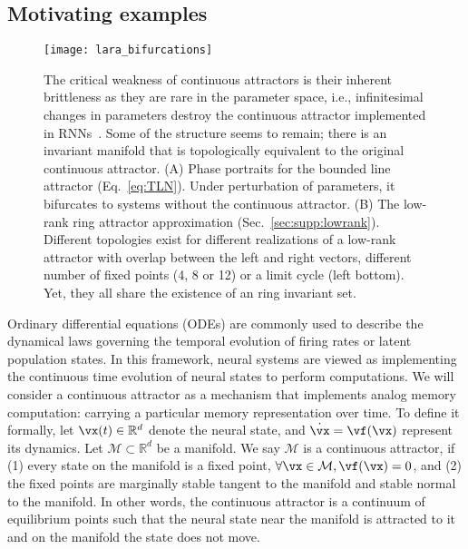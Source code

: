 \documentclass{article} %
\newcounter{ct}
\newcommand{\reals}{\mathbb{R}}
\newcommand{\manifold}{\mathcal{M}}
\theoremstyle{definition}
\theoremstyle{remark}
\renewcommand{\cite}{\citep}
\begin{document}
\subsection{Motivating examples}\label{sec:motivating}
\begin{figure}[tbhp]
  \centering
  \texttt{[image: lara\_bifurcations]}
  \caption{The critical weakness of continuous attractors is their inherent brittleness as they are rare in the parameter space, i.e., infinitesimal changes in parameters destroy the continuous attractor implemented in RNNs~\cite{seung1996,Renart2003}.
  Some of the structure seems to remain; there is an invariant manifold that is topologically equivalent to the original continuous attractor.
    (A) Phase portraits for the bounded line attractor (Eq.~\eqref{eq:TLN}).
    Under perturbation of parameters, it bifurcates to systems without the continuous attractor.
    (B) The low-rank ring attractor approximation (Sec.~\eqref{sec:supp:lowrank}).
    Different topologies exist for different realizations of a low-rank attractor with overlap between the left and right vectors, different number of fixed points (4, 8 or 12) or a limit cycle (left bottom).
    Yet, they all share the existence of an ring invariant set.
}
\label{fig:lara_bifurcations}
\end{figure}


Ordinary differential equations (ODEs) are commonly used to describe the dynamical laws governing the temporal evolution of firing rates or latent population states\cite{vyas2020}.
In this framework, neural systems are viewed as implementing the continuous time evolution of neural states to perform computations.
We will consider a continuous attractor as a mechanism that implements analog memory computation: carrying a particular memory representation over time.
To define it formally, let $\vx(t) \in \reals^d$ denote the neural state, and $\dot{\vx} = \vf(\vx)$ represent its dynamics.
Let $\manifold \subset \reals^d$ be a manifold.
We say $\manifold$ is a continuous attractor, if (1) every state on the manifold is a fixed point, $\forall \vx \in \manifold, \vf(\vx) = 0$, and (2) the fixed points are marginally stable tangent to the manifold and stable normal to the manifold.
In other words, the continuous attractor is a continuum of equilibrium points such that the neural state near the manifold is attracted to it and on the manifold the state does not move.
\end{document}
